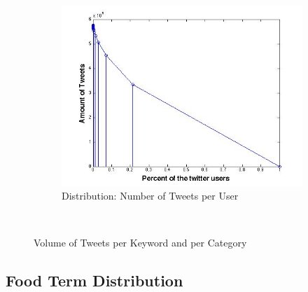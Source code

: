 \begin{figure}[ht]
\begin{subfigure}[b]{0.5\textwidth}
                \label{fig:u_log}
        \end{subfigure}
        ~ %
      \begin{subfigure}[b]{0.5\textwidth}
                \includegraphics[width=\textwidth]{img/anal/no_power}
                \caption{Distribution: Number of Tweets per User}
                \label{fig:no_power}
        \end{subfigure}
        ~ %

      
        \caption{Volume of Tweets per Keyword and per Category}\label{fig:distribution}
\end{figure}

\subsection {Food Term Distribution}


